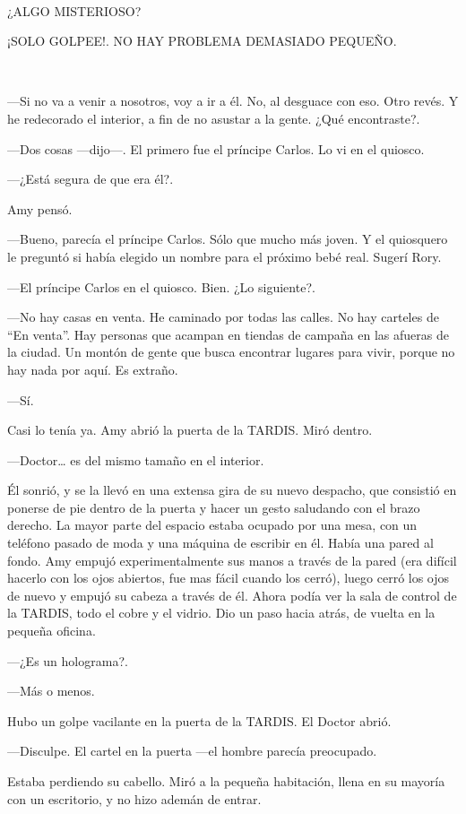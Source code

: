 ~

¿ALGO MISTERIOSO?

¡SOLO GOLPEE!. NO HAY PROBLEMA DEMASIADO PEQUEÑO.

~

---Si no va a venir a nosotros, voy a ir a él. No, al desguace con eso. Otro revés. Y he redecorado el interior, a fin de no asustar a la gente. ¿Qué encontraste?.

---Dos cosas ---dijo---. El primero fue el príncipe Carlos. Lo vi en el quiosco.

---¿Está segura de que era él?.

Amy pensó.

---Bueno, parecía el príncipe Carlos. Sólo que mucho más joven. Y el quiosquero le preguntó si había elegido un nombre para el próximo bebé real. Sugerí Rory.

---El príncipe Carlos en el quiosco. Bien. ¿Lo siguiente?.

---No hay casas en venta. He caminado por todas las calles. No hay carteles de ``En venta''. Hay personas que acampan en tiendas de campaña en las afueras de la ciudad. Un montón de gente que busca encontrar lugares para vivir, porque no hay nada por aquí. Es extraño.

---Sí.

Casi lo tenía ya. Amy abrió la puerta de la TARDIS. Miró dentro.

---Doctor\ldots{} es del mismo tamaño en el interior.

Él sonrió, y se la llevó en una extensa gira de su nuevo despacho, que consistió en ponerse de pie dentro de la puerta y hacer un gesto saludando con el brazo derecho. La mayor parte del espacio estaba ocupado por una mesa, con un teléfono pasado de moda y una máquina de escribir en él. Había una pared al fondo. Amy empujó experimentalmente sus manos a través de la pared (era difícil hacerlo con los ojos abiertos, fue mas fácil cuando los cerró), luego cerró los ojos de nuevo y empujó su cabeza a través de él. Ahora podía ver la sala de control de la TARDIS, todo el cobre y el vidrio. Dio un paso hacia atrás, de vuelta en la pequeña oficina.

---¿Es un holograma?.

---Más o menos.

Hubo un golpe vacilante en la puerta de la TARDIS. El Doctor abrió.

---Disculpe. El cartel en la puerta ---el hombre parecía preocupado.

Estaba perdiendo su cabello. Miró a la pequeña habitación, llena en su mayoría con un escritorio, y no hizo ademán de entrar.

